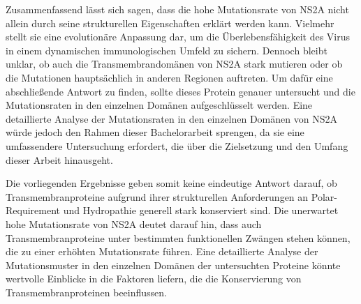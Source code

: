 \documentclass[german,version-2022-01]{uzl-thesis}
\begin{document}
Zusammenfassend l\"asst sich sagen, dass die hohe Mutationsrate von NS2A nicht allein durch seine strukturellen Eigenschaften erkl\"art werden kann. Vielmehr stellt sie eine evolution\"are Anpassung dar, um die \"Uberlebensf\"ahigkeit des Virus in einem dynamischen immunologischen Umfeld zu sichern. Dennoch bleibt unklar, ob auch die Transmembrandom\"anen von NS2A stark mutieren oder ob die Mutationen haupts\"achlich in anderen Regionen auftreten. Um daf\"ur eine abschlie\ss{}ende Antwort zu finden, sollte dieses Protein genauer untersucht und die Mutationsraten in den einzelnen Dom\"anen aufgeschl\"usselt werden. Eine detaillierte Analyse der Mutationsraten in den einzelnen Dom\"anen von NS2A w\"urde jedoch den Rahmen dieser Bachelorarbeit sprengen, da sie eine umfassendere Untersuchung erfordert, die \"uber die Zielsetzung und den Umfang dieser Arbeit hinausgeht.

Die vorliegenden Ergebnisse geben somit keine eindeutige Antwort darauf, ob Transmembranproteine aufgrund ihrer strukturellen Anforderungen an Polar-Requirement und Hydropathie generell stark konserviert sind. Die unerwartet hohe Mutationsrate von NS2A deutet darauf hin, dass auch Transmembranproteine unter bestimmten funktionellen Zw\"angen stehen k\"onnen, die zu einer erh\"ohten Mutationsrate f\"uhren. Eine detaillierte Analyse der Mutationsmuster in den einzelnen Dom\"anen der untersuchten Proteine k\"onnte wertvolle Einblicke in die Faktoren liefern, die die Konservierung von Transmembranproteinen beeinflussen.
\end{document}
